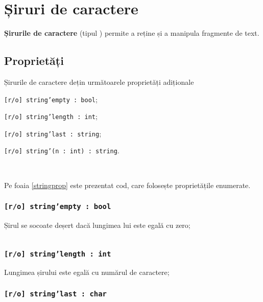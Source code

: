 \section{Șiruri de caractere}

{\bf Șirurile de caractere} (tipul \str{}) permite a reține și a manipula fragmente de text. 

\subsection{Proprietăți}

Șirurile de caractere dețin următoarele proprietăți adiționale
\begin{icItems}
\item
	\texttt{[r/o] string'empty : bool};
\item
	\texttt{[r/o] string'length : int};
\item
	\texttt{[r/o] string'last : string};
\item
	\texttt{[r/o] string'(n : int) : string}.
\end{icItems}

\

Pe foaia \ref{stringprop} este prezentat cod, care folosește proprietățile enumerate.

\subsubsection{\texttt{[r/o] string'empty : bool}}

Șirul se socoate deșert dacă lungimea lui este egală cu zero;

\begin{sourcecode}
    \label{stringprop}
    \inputminted[linenos]{icl}{../sources/stringprop.icL}
\end{sourcecode}

\subsubsection{\texttt{[r/o] string'length : int}}

Lungimea șirului este egală cu numărul de caractere;

\subsubsection{\texttt{[r/o] string'last : char}}


